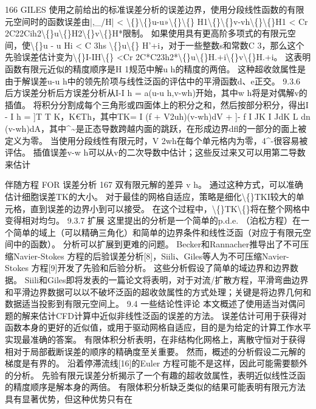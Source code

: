 \documentclass[UTF8,11pt,a4paper,openany,fontset=fandol]{ctexbook}
\begin{document}
166 GILES 使用之前给出的标准误差分析的误差边界，使用分段线性函数的有限元空间时的函数误差由|,\_/H| < \textbackslash\{\}\textbackslash\{\}u-u»\textbackslash\{\}\textbackslash\{\} H1\textbackslash\{\}\textbackslash\{\}v-vh\textbackslash\{\}\textbackslash\{\}H1 < Cr 2C22Cih2\textbackslash\{\}u\textbackslash\{\}H2\textbackslash\{\}v\textbackslash\{\}H*限制。 如果使用具有更高阶多项式的有限元空间，使\textbackslash\{\}u - u Hi < C 3hs \textbackslash\{\}u\textbackslash\{\} H'+i，对于一些整数s和常数C 3，那么这个先验误差估计变为\textbackslash\{\}I-IH\textbackslash\{\} <Cr 2C*C23h2*\textbackslash\{\}u\textbackslash\{\}H.+i\textbackslash\{\}v\textbackslash\{\}H.+i。 这表明函数有限元近似的精度顺序是H 1规范中解u h的精度的两倍。 这种超收敛属性是由于解误差u-u h中的领先阶项与线性泛函的评估中的平滑函数d、e正交。 9.3.6 后方误差分析后方误差分析从I-I h = a(u-u h,v-wh)开始，其中w h将是对偶解v的插值。 将积分分割成每个三角形或四面体上的积分之和，然后按部分积分，得出I - I h = ]T T K，K€Th，其中TK= I (f + V2uh)(v-wh)dV + ]- f I JK I JdK L dn (v-wh)dA，其中\textasciicircum{}\textasciitilde{}是正态导数跨越内面的跳跃，在形成边界dfl的一部分的面上被定义为零。 当使用分段线性有限元时，V 2wh在每个单元格内为零，4\textasciicircum{}-很容易被评估。 插值误差v-w h可以从v的二次导数中估计；这些反过来又可以用第二导数来估计

伴随方程 FOR 误差分析 167 双有限元解的差异 v h。 通过这种方式，可以准确估计细胞误差TK的大小。 对于最佳的网格自适应，策略是细化\textbackslash\{\}TKI较大的单元格，直到误差的边界小到可以接受。 在这个过程中，\textbackslash\{\}TK\textbackslash\{\}将在整个网格中变得相对均匀。 9.3.7 扩展 这里提出的分析是一个简单的p.d.e. （泊松方程）在一个简单的域上（可以精确三角化）和简单的边界条件和线性泛函（对应于有限元空间中的函数）。 分析可以扩展到更难的问题。 Becker和Rannacher推导出了不可压缩Navier-Stokes 方程的后验误差分析[8]，Siili、Giles等人为不可压缩Navier-Stokes 方程[9]开发了先验和后验分析。 这些分析假设了简单的域边界和边界数据。 Siili和Giles即将发表的一篇论文将表明，对于对流/扩散方程，平滑弯曲边界和平滑边界数据可以以不破坏泛函的超收敛属性的方式处理；关键是将边界几何和数据适当投影到有限元空间上。 9.4 一些结论性评论 本文概述了使用适当对偶问题的解来估计CFD计算中近似非线性泛函的误差的方法。 误差估计可用于获得对函数本身的更好的近似值，或用于驱动网格自适应，目的是为给定的计算工作水平实现最准确的答案。 有限体积分析表明，在非结构化网格上，离散守恒对于获得相对于局部截断误差的顺序的精确度至关重要。 然而，概述的分析假设二元解的梯度是有界的。 沿着停滞流线[16]的Euler 方程可能不是这样，因此可能需要额外的分析。 先验有限元误差分析揭示了一个有趣的超收敛属性，表明近似线性泛函的精度顺序是解本身的两倍。 有限体积分析缺乏类似的结果可能表明有限元方法具有显著优势，但这种优势只有在
\end{document}
